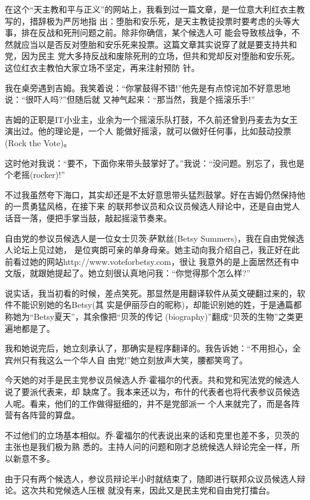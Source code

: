 ﻿\documentclass[11pt]{article}
\begin{document}
在这个``天主教和平与正义''的网站上，我看到过一篇文章，是一位意大利红衣主教写的，措辞极为严厉地指
出：堕胎和安乐死，是天主教徒投票时要考虑的头等大事，排在反战和死刑问题之前。除非你确信，某个候选人可
能会导致核战争，不然就应当以是否反对堕胎和安乐死来投票。这篇文章其实说穿了就是要支持共和党，因为民主
党大多持反战和废除死刑的立场，但共和党却反对堕胎和安乐死。这位红衣主教怕大家立场不坚定，再来注射预防
针。

我在桌旁遇到吉姆。我笑着说：``你掌鼓得不错!''他先是有点惊诧加不好意思地说：``很吓人吗?''但随后就
又神气起来：``那当然，我是个摇滚乐手!''

吉姆的正职是IT小业主，业余为一个摇滚乐队打鼓，不久前还曾到丹麦去为女王演出过。他的理论是，一个人
能做好摇滚，就可以做好任何事，比如鼓动投票(Rock the Vote)。

这时他对我说：``要不，下面你来带头鼓掌好了。''我说：``没问题。别忘了，我也是个老摇(rocker)!''

不过我虽然夸下海口，其实却还是不太好意思带头猛烈鼓掌。好在吉姆仍然保持他的一贯勇猛风格，在接下来
的联邦参议员和众议员候选人辩论中，还是自由党人话音一落，便把手掌当鼓，敲起摇滚节奏来。

自由党的参议员候选人是一位女士贝茨$\cdot$萨默丝(Betsy Summers)，我在自由党候选人论坛上见过她，
是位爽朗可亲的单身母亲。她主动向我介绍自己，我正好在此前看过她的网站http://www.voteforbetsy.com，很让
我意外的是上面居然还有中文版，就跟她提起了。她立刻很认真地问我：``你觉得那个怎么样?''

说实话，我当初看的时候，差点笑死。那显然是用翻译软件从英文硬翻过来的，软件不能识别她的名Betsy(其
实是伊丽莎白的昵称)，却能识别她的姓，于是通篇都称她为``Betsy夏天''，其余像把``贝茨的传记
(biography)''翻成``贝茨的生物''之类更遍地都是了。

我和她说完后，她立刻承认了，那确实是程序翻译的。我告诉她：``不用担心，全宾州只有我这么一个华人自
由党!''她立刻放声大笑，腰都笑弯了。

今天她的对手是民主党参议员候选人乔$\cdot$霍福尔的代表。共和党和宪法党的候选人说了要派代表来，却
缺席了。我本来还以为，布什的代表者也将代表参议员候选人呢。看来，他们的工作做得挺细的，并不是党部派一
个人来就完了，而是各阵营有各阵营的算盘。

不过他们的立场基本相似。乔$\cdot$霍福尔的代表说出来的话和克里也差不多，贝茨的主张也是我们极为熟
悉的。主持人问的问题和刚才总统候选人辩论完全一样，所以新意不多。


由于只有两个候选人，参议员辩论半小时就结束了，随即进行联邦众议员候选人辩论。这次共和党候选人压根
就没有来，因此又是民主党和自由党打擂台。
\end{document}

